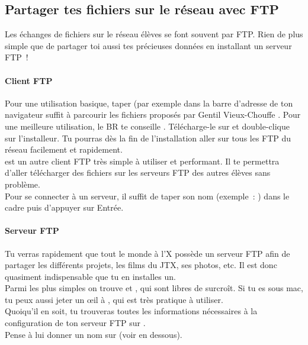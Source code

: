 \subsection{Partager tes fichiers sur le réseau avec FTP}

Les échanges de fichiers sur le réseau élèves se font souvent par FTP. Rien de plus simple que de partager toi aussi tes précieuses données en installant un serveur FTP~!

\paragraph{Client FTP}
Pour une utilisation basique, taper   (par exemple  dans la barre d'adresse de ton navigateur suffit à parcourir les fichiers proposés par \og Gentil Vieux-Chouffe \fg.
Pour une meilleure utilisation, le BR te conseille . Télécharge-le sur  et double-clique sur l'installeur.
Tu pourras dès la fin de l'installation aller sur tous les FTP du réseau facilement et rapidement.\\
  est un autre client FTP très simple à  utiliser et performant. Il te permettra d'aller télécharger des fichiers sur les serveurs FTP des autres élèves sans problème.\\
Pour se connecter à  un serveur, il suffit de taper son nom (exemple~: ) dans le cadre  puis d'appuyer sur Entrée.\\


\paragraph{Serveur FTP}
Tu verras rapidement que tout le monde à  l'X possède un serveur FTP
afin de partager les différents projets, les films du JTX, ses
photos, etc. Il est donc quasiment indispensable que tu en installes un.\\

Parmi les plus simples on trouve  et , qui sont libres de surcroît.
Si tu es sous mac, tu peux aussi jeter un œ{}il à , qui est très pratique à utiliser.\\
Quoiqu'il en soit, tu trouveras toutes les informations nécessaires à la configuration de ton serveur FTP sur .\\
Pense à lui donner un nom sur  (voir en dessous).
